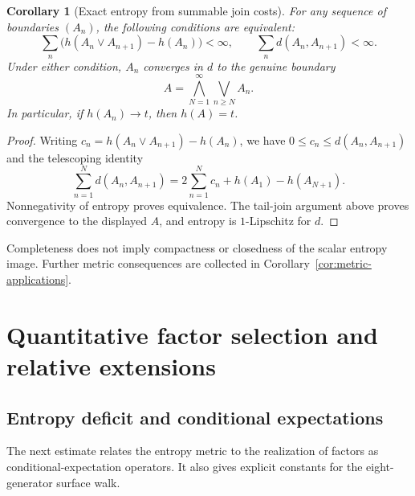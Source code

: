 \documentclass[11pt,letterpaper]{amsart}
\newtheorem{corollary}[theorem]{Corollary}
\theoremstyle{definition}
\theoremstyle{remark}
\numberwithin{equation}{section}
\begin{document}
\begin{corollary}[Exact entropy from summable join costs]
\label{cor:summable-join-selection}
For any sequence of boundaries $(A_n)$, the following conditions
are equivalent:
\[
 \sum_n\bigl(h(A_n\vee A_{n+1})-h(A_n)\bigr)<\infty,
 \qquad
 \sum_n d(A_n,A_{n+1})<\infty.
\]
Under either condition, $A_n$ converges in $d$ to the genuine boundary
\[
 A=\bigwedge_{N=1}^{\infty}\bigvee_{n\ge N}A_n.
\]
In particular, if $h(A_n)\to t$, then $h(A)=t$.
\end{corollary}
\begin{proof}
Writing $c_n=h(A_n\vee A_{n+1})-h(A_n)$, we have $0\le c_n\le d(A_n,A_{n+1})$
and the telescoping identity
\[
 \sum_{n=1}^N d(A_n,A_{n+1})
 =2\sum_{n=1}^N c_n+h(A_1)-h(A_{N+1}).
\]
Nonnegativity of entropy proves equivalence. The tail-join argument
above proves convergence to the displayed $A$, and entropy is
$1$-Lipschitz for $d$.
\end{proof}

Completeness does not imply compactness or closedness of the scalar
entropy image. Further metric consequences are collected in
Corollary~\ref{cor:metric-applications}.

\section{Quantitative factor selection and relative extensions}
\label{sec:join-selection}

\subsection{Entropy deficit and conditional expectations}

The next estimate relates the entropy metric to the realization of
factors as conditional-expectation operators. It also gives explicit
constants for the eight-generator surface walk.
\end{document}
